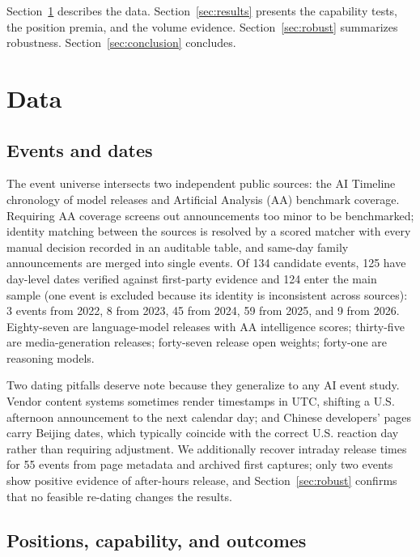 \documentclass[review,12pt,authoryear]{elsarticle}
\begin{document}
Section~\ref{sec:data} describes the data. Section~\ref{sec:results}
presents the capability tests, the position premia, and the volume evidence.
Section~\ref{sec:robust} summarizes robustness. Section~\ref{sec:conclusion}
concludes.

\section{Data}\label{sec:data}

\subsection{Events and dates}

The event universe intersects two independent public sources: the AI
Timeline chronology of model releases and Artificial Analysis (AA) benchmark
coverage. Requiring AA coverage screens out announcements too minor to be
benchmarked; identity matching between the sources is resolved by a scored
matcher with every manual decision recorded in an auditable table, and
same-day family announcements are merged into single events. Of 134
candidate events, 125 have day-level dates verified against first-party
evidence and 124 enter the main sample (one event is excluded because its
identity is inconsistent across sources): 3 events from 2022, 8 from 2023,
45 from 2024, 59 from 2025, and 9 from 2026. Eighty-seven are language-model
releases with AA intelligence scores; thirty-five are media-generation
releases; forty-seven release open weights; forty-one are reasoning models.

Two dating pitfalls deserve note because they generalize to any AI event
study. Vendor content systems sometimes render timestamps in UTC, shifting a
U.S. afternoon announcement to the next calendar day; and Chinese
developers' pages carry Beijing dates, which typically coincide with the
correct U.S. reaction day rather than requiring adjustment. We additionally
recover intraday release times for 55 events from page metadata and archived
first captures; only two events show positive evidence of after-hours
release, and Section~\ref{sec:robust} confirms that no feasible re-dating
changes the results.

\subsection{Positions, capability, and outcomes}
\end{document}
